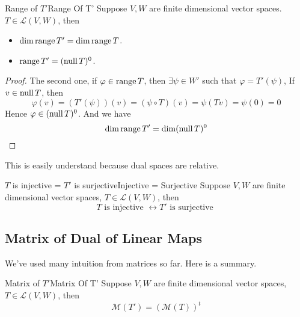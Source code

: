 \documentclass[../main.tex]{subfiles}
\begin{document}
\begin{theorem}{Range of $T'$}{Range Of T'}
Suppose $V,W$ are finite dimensional vector spaces. $T\in \mathscr{L}(V,W)$, then
\begin{itemize}
\item $\dim \operatorname{range} T' = \dim \operatorname{range} T$.
\item $\operatorname{range} T' = (\operatorname{null} T)^0$.
\end{itemize}
\end{theorem}
\begin{proof}
The second one, if $\varphi\in \operatorname{range} T$, then $\exists \psi\in W'$ such that $\varphi = T'(\psi)$, If  $v\in \operatorname{null} T$, then
\begin{equation*}
\varphi(v) = (T'(\psi))(v)=(\psi\circ T)(v) = \psi(Tv) = \psi(0)=0
\end{equation*}
Hence $\varphi\in (\operatorname{null} T)^0$. And we have
\begin{equation*}
\dim \operatorname{range} T' = \dim (\operatorname{null} T)^0
\end{equation*}
\end{proof}

\begin{remark}
This is easily understand because dual spaces are relative.
\end{remark}

\begin{theorem}{$T$ is injective = $T'$ is surjective}{Injective = Surjective}
Suppose $V,W$ are finite dimensional vector spaces, $T\in \mathscr{L}(V,W)$, then
\begin{equation*}
T \text{ is injective } \leftrightarrow T' \text{ is surjective }
\end{equation*}
\end{theorem}

\subsection{Matrix of Dual of Linear Maps}

We've used many intuition from matrices so far. Here is a summary.
\begin{theorem}{Matrix of $T'$}{Matrix Of T'}
Suppose $V,W$ are finite dimensional vector spaces, $T\in \mathscr{L}(V,W)$, then
\begin{equation*}
\mathscr{M}(T') = (\mathscr{M}(T))^t
\end{equation*}
\end{theorem}
\end{document}
